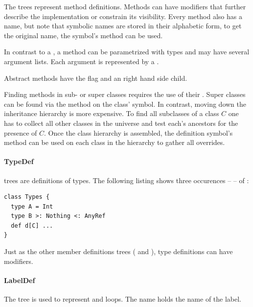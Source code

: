 \noindent The  trees represent method definitions. Methods can have modifiers that further describe the implementation or constrain its visibility. Every method also has a name, but note that symbolic names are stored in their alphabetic form, to get the original name, the symbol's  method can be used.

In contrast to a , a method can be parametrized with types and may have several argument lists. Each argument is represented by a .

Abstract methods have the \textsc{} flag and an  right hand side child.

Finding methods in sub- or super classes requires the use of their . Super classes can be found via the  method on the class' symbol. In contrast, moving down the inheritance hierarchy is more expensive. To find all subclasses of a class $C$ one has to collect all other classes in the universe and test each's ancestors for the presence of $C$. Once the class hierarchy is assembled, the definition symbol's  method can be used on each class in the hierarchy to gather all overrides.

\paragraph{TypeDef} 

\noindent {} trees are definitions of types. The following listing shows three occurences --  -- of :

\begin{lstlisting}
class Types {
  type A = Int
  type B >: Nothing <: AnyRef
  def d[C] ...
}
\end{lstlisting}

Just as the other member definitions trees ( and ), type definitions can have modifiers.

\paragraph{LabelDef} 

\noindent The  tree is used to represent  and  loops. The name holds the name of the label.

